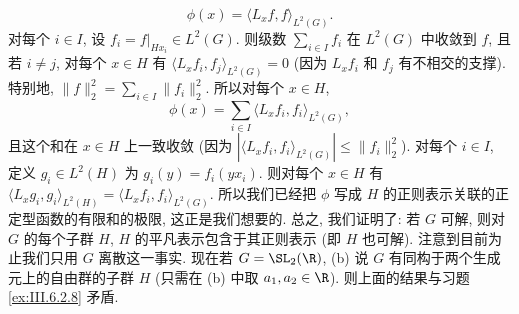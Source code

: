 \begin{solution}
\[
\phi(x) = \langle L_xf, f \rangle_{L^2(G)}.
\]
对每个 $i \in I$, 设 $f_i = f|_{Hx_i} \in L^2(G)$. 则级数 $\sum_{i \in I}f_i$ 在 $L^2(G)$ 中收敛到 $f$, 且若 $i \neq j$, 对每个 $x \in H$ 有 $\langle L_xf_i, f_j \rangle_{L^2(G)} = 0$ (因为 $L_xf_i$ 和 $f_j$ 有不相交的支撑). 特别地, $\|f\|_2^2 = \sum_{i \in I}\|f_i\|_2^2$. 所以对每个 $x \in H$,
\[
\phi(x) = \sum_{i \in I}\langle L_xf_i, f_i \rangle_{L^2(G)},
\]
且这个和在 $x \in H$ 上一致收敛 (因为 $|\langle L_xf_i, f_i \rangle_{L^2(G)}| \leq \|f_i\|_2^2$).
对每个 $i \in I$, 定义 $g_i \in L^2(H)$ 为 $g_i(y) = f_i(yx_i)$. 则对每个 $x \in H$ 有 $\langle L_xg_i, g_i \rangle_{L^2(H)} = \langle L_xf_i, f_i \rangle_{L^2(G)}$. 所以我们已经把 $\phi$ 写成 $H$ 的正则表示关联的正定型函数的有限和的极限, 这正是我们想要的.
总之, 我们证明了: 若 $G$ 可解, 则对 $G$ 的每个子群 $H$, $H$ 的平凡表示包含于其正则表示 (即 $H$ 也可解). 注意到目前为止我们只用 $G$ 离散这一事实.
现在若 $G = \SL_2(\R)$, (b) 说 $G$ 有同构于两个生成元上的自由群的子群 $H$ (只需在 (b) 中取 $a_1, a_2 \in \R$). 则上面的结果与习题 \ref{ex:III.6.2.8} 矛盾.
\end{solution}

